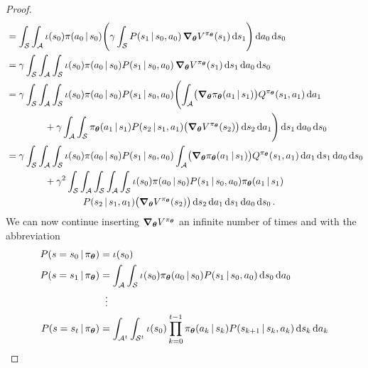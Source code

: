 \begin{proof}
\begin{align}
					&= \int_\mathcal{S} \int_\mathcal{A} \iota(s_0) \pi(a_0 \,\vert\, s_0) \Biggl( \gamma \int_\mathcal{S} P(s_1 \,\vert\, s_0, a_0) \, \grad_{\bm{\theta}} V^{\pi_{\bm{\theta}}}(s_1) \dd{s_1} \Biggr) \dd{a_0} \dd{s_0} \\
					&= \gamma \int_\mathcal{S} \int_\mathcal{A} \int_\mathcal{S} \iota(s_0) \pi(a_0 \,\vert\, s_0) P(s_1 \,\vert\, s_0, a_0) \, \grad_{\bm{\theta}} V^{\pi_{\bm{\theta}}}(s_1) \dd{s_1} \dd{a_0} \dd{s_0}  \label{eq:pgtStep} \\
					&= \gamma \int_\mathcal{S} \int_\mathcal{A} \int_\mathcal{S} \iota(s_0) \pi(a_0 \,\vert\, s_0) P(s_1 \,\vert\, s_0, a_0) \Biggl( \int_\mathcal{A} \bigl( \grad_{\bm{\theta}} \pi_{\bm{\theta}}(a_1 \,\vert\, s_1) \bigr) Q^{\pi_{\bm{\theta}}}(s_1, a_1) \dd{a_1} \\&\qquad\qquad
						+ \gamma \int_\mathcal{A} \int_\mathcal{S} \pi_{\bm{\theta}}(a_1 \,\vert\, s_1) P(s_2 \,\vert\, s_1, a_1) \bigl( \grad_{\bm{\theta}} V^{\pi_{\bm{\theta}}}(s_2) \bigr) \dd{s_2} \dd{a_1} \Biggr) \dd{s_1} \dd{a_0} \dd{s_0} \\
					&= \gamma \int_\mathcal{S} \int_\mathcal{A} \int_\mathcal{S} \iota(s_0) \pi(a_0 \,\vert\, s_0) P(s_1 \,\vert\, s_0, a_0) \int_\mathcal{A} \bigl( \grad_{\bm{\theta}} \pi_{\bm{\theta}}(a_1 \,\vert\, s_1) \bigr) Q^{\pi_{\bm{\theta}}}(s_1, a_1) \dd{a_1} \dd{s_1} \dd{a_0} \dd{s_0} \\&\qquad\qquad
						+ \gamma^2 \int_\mathcal{S} \int_\mathcal{A} \int_\mathcal{S} \int_\mathcal{A} \int_\mathcal{S} \iota(s_0) \pi(a_0 \,\vert\, s_0) P(s_1 \,\vert\, s_0, a_0) \pi_{\bm{\theta}}(a_1 \,\vert\, s_1) \\&\qquad\qquad\qquad\qquad
						  P(s_2 \,\vert\, s_1, a_1) \bigl( \grad_{\bm{\theta}} V^{\pi_{\bm{\theta}}}(s_2) \bigr) \dd{s_2} \dd{a_1} \dd{s_1} \dd{a_0} \dd{s_0}.
			\end{align}
			We can now continue inserting \( \grad_{\bm{\theta}} V^{\pi_{\bm{\theta}}} \) an infinite number of times and with the abbreviation
			\begin{align}
				P(s = s_0 \given \pi_{\vec{\theta}}) &= \iota(s_0) \\
				P(s = s_1 \given \pi_{\vec{\theta}}) &= \int_\mathcal{A} \int_\mathcal{S} \iota(s_0) \pi_{\vec{\theta}}(a_0 \given s_0) P(s_1 \given s_0, a_0) \dd{s_0} \dd{a_0} \\
				&\;\;\vdots \\
				P(s = s_t \given \pi_{\vec{\theta}}) &= \int_{\mathcal{A}^t} \int_{\mathcal{S}^t} \iota(s_0) \prod_{k = 0}^{t - 1} \pi_{\vec{\theta}}(a_k \given s_k) P(s_{k + 1} \given s_k, a_k) \dd{s_k} \dd{a_k}  \label{eq:pgtDef}

\end{align}
\end{proof}
